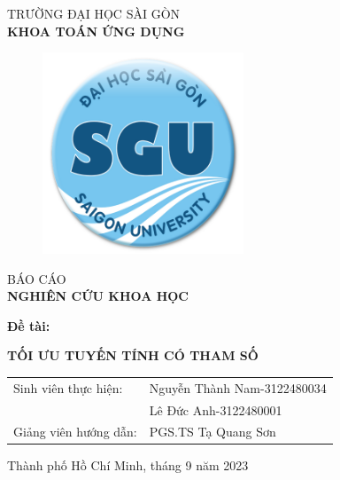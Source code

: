 \documentclass{article} %
\begin{document}
\begin{titlepage}
\begin{center}
\vspace{-15pt} TRƯỜNG ĐẠI HỌC SÀI GÒN\\
\textbf{\fontsize{16pt}{0pt}\selectfont KHOA TOÁN ỨNG DỤNG}
\vspace{0.5cm}
\begin{figure}[H]
    \centering
    \includegraphics[width=6cm,height=6cm]{bianckh.png}
\end{figure}
\vspace{1.5cm}
\fontsize{24pt}{0pt}\selectfont BÁO CÁO\\
\vspace{12pt}
\textbf{\fontsize{32pt}{0pt}\selectfont NGHIÊN CỨU KHOA HỌC}
\vspace{1.5cm}
\end{center}
\hspace{20pt}\textbf{\fontsize{14pt}{0pt}\selectfont Đề tài:}
\begin{center}
\textbf{\fontsize{20pt}{0pt}\selectfont TỐI ƯU TUYẾN TÍNH CÓ THAM SỐ} 
\vspace{1cm}
\begin{table}[H]
    \centering
    \begin{tabular}{l l}
\fontsize{14pt}{0pt}\selectfont Sinh viên thực hiện:     & \fontsize{14pt}{0pt}\selectfont Nguyễn Thành Nam-3122480034 \vspace{6pt}\\     
                                                         & \fontsize{14pt}{0pt}\selectfont Lê Đức Anh-3122480001 \vspace{6pt}\\
\fontsize{14pt}{0pt}\selectfont Giảng viên hướng dẫn: & \fontsize{14pt}{0pt}\selectfont PGS.TS Tạ Quang Sơn
\end{tabular}
\end{table}
\vspace{1.5cm}
\fontsize{14pt}{0pt}\selectfont Thành phố Hồ Chí Minh, tháng 9 năm 2023
\end{center}
\end{titlepage}
\end{document}
